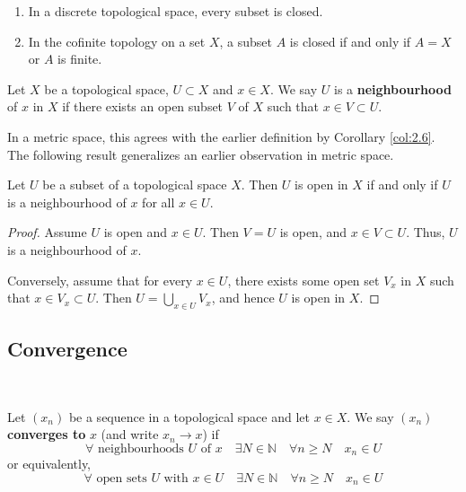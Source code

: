\documentclass[a4paper]{article}
\begin{document}
\begin{example}
    \begin{enumerate}
        \item In a discrete topological space, every subset is closed.
      
        \item In the cofinite topology on a set $X$, a subset $A$ is closed if and only if $A=X$ or $A$ is finite.
      
      \end{enumerate}
\end{example}

\begin{definition}
    Let $X$ be a topological space, $U \subset X$ and $x \in X$. We say $U$ is a \textbf{neighbourhood} of $x$ in $X$ if there exists an open subset $V$ of $X$ such that $x \in V \subset U$.
\end{definition}

\begin{note}
    In a metric space, this agrees with the earlier definition by Corollary \ref{col:2.6}. The following result generalizes an earlier observation in metric space.
\end{note}

\begin{proposition}
    Let $U$ be a subset of a topological space $X$. Then $U$ is open in $X$ if and only if $U$ is a neighbourhood of $x$ for all $x \in U$.
\end{proposition}

\begin{proof}
    Assume $U$ is open and $x \in U$. Then $V=U$ is open, and $x \in V \subset U$. Thus, $U$ is a neighbourhood of $x$.

    Conversely, assume that for every $x \in U$, there exists some open set $V_{x}$ in $X$ such that $x \in V_{x} \subset U$. Then $U=\bigcup_{x \in U} V_{x}$, and hence $U$ is open in $X$.
\end{proof}

\subsection{Convergence}\ \vspace{-1.5em}
\begin{definition}
    Let $\left(x_{n}\right)$ be a sequence in a topological space and let $x \in X$. We say $\left(x_{n}\right)$ \textbf{converges to} $x$ (and write $x_{n} \rightarrow x$) if
    $$
    \forall \text { neighbourhoods } U \text { of } x \quad \exists N \in \mathbb{N} \quad \forall n \geqslant N \quad x_{n} \in U
    $$
    or equivalently,
    $$
    \forall \text { open sets } U \text { with } x \in U \quad \exists N \in \mathbb{N} \quad \forall n \geqslant N \quad x_{n} \in U
    $$
\end{definition}
\end{document}
